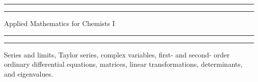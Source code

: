 


\begin{titlepage} %

	\centering %
	
	\scshape %
	
	\vspace*{\baselineskip} %
	
	
	\rule{\textwidth}{1.6pt}\vspace*{-\baselineskip}\vspace*{2pt} %
	\rule{\textwidth}{0.4pt} %
	
	\vspace{\baselineskip} %
	
	{\LARGE Applied Mathematics for Chemists I} %
	
	\vspace{0.3\baselineskip} %
	
	\rule{\textwidth}{0.4pt}\vspace*{-\baselineskip}\vspace{3.2pt} %
	\rule{\textwidth}{1.6pt} %
	
	\vspace{2\baselineskip} %
	
	
	Series and limits, Taylor series, complex variables, first- and second- order ordinary differential equations, matrices, linear transformations, determinants, and eigenvalues. %
	
	\vspace*{3\baselineskip} %
	
	

\end{titlepage}
